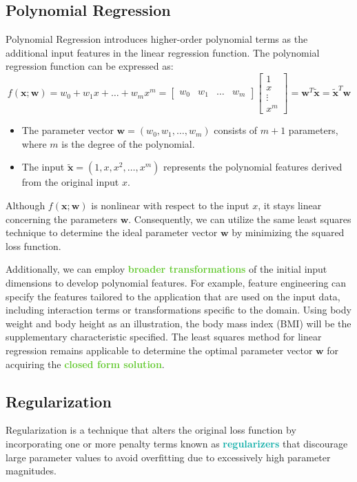 \documentclass[twoside]{article}
\newcommand{\highlightbluetext}[1]{\textcolor[HTML]{09ACA6}{\textbf{#1}}}
\newcommand{\highlightgreentext}[1]{\textcolor[HTML]{62C92F}{\textbf{#1}}}
\numberwithin{equation}{section}
\begin{document}
	\subsection{Polynomial Regression}
	\label{subsec:PolynomialRegression}
	Polynomial Regression introduces higher-order polynomial terms as the additional input features in the linear regression function. The polynomial regression function can be expressed as:
	\begin{equation}
		\boxed{f(\mathbf{x}; \mathbf{w}) = w_0 + w_1 x + \ldots + w_m x^m = \begin{bmatrix} w_0 & w_1 & \ldots & w_m \end{bmatrix} \begin{bmatrix} 1 \\ x \\ \vdots \\ x^m \end{bmatrix} = \mathbf{w}^T \mathbf{\tilde{x}} = \mathbf{\tilde{x}}^T \mathbf{w}}
	\end{equation}
	\begin{itemize}
		\item The parameter vector $\mathbf{w} = (w_0, w_1, \ldots, w_m)$ consists of $m + 1$ parameters, where $m$ is the degree of the polynomial. 
		\item The input $\mathbf{\tilde{x}} = (1, x, x^2, \ldots, x^m)$ represents the polynomial features derived from the original input $x$.
	\end{itemize}
	Although $f(\mathbf{x}; \mathbf{w})$ is nonlinear with respect to the input $x$, it stays linear concerning the parameters $\mathbf{w}$. Consequently, we can utilize the same least squares technique to determine the ideal parameter vector $\mathbf{w}$ by minimizing the squared loss function.

	Additionally, we can employ \highlightgreentext{broader transformations} of the initial input dimensions to develop polynomial features. For example, feature engineering can specify the features tailored to the application that are used on the input data, including interaction terms or transformations specific to the domain. Using body weight and body height as an illustration, the body mass index (BMI) will be the supplementary characteristic specified. The least squares method for linear regression remains applicable to determine the optimal parameter vector $\mathbf{w}$ for acquiring the \highlightgreentext{closed form solution}.

	\subsection{Regularization}
	\label{subsec:Regularization}
	Regularization is a technique that alters the original loss function by incorporating one or more penalty terms known as \highlightbluetext{regularizers} that discourage large parameter values to avoid overfitting due to excessively high parameter magnitudes.
\end{document}
